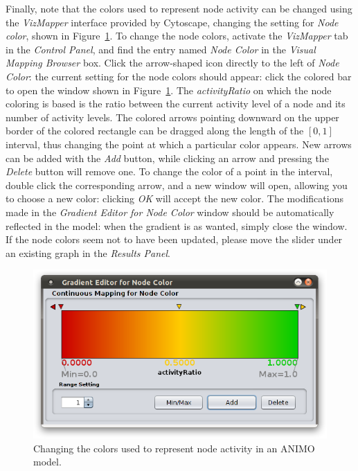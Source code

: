 Finally, note that the colors used to represent node activity can be changed using the \emph{VizMapper}
interface provided by Cytoscape, changing the setting for \emph{Node color}, shown in Figure~\ref{fig:change-gradient}.
To change the node colors, activate the \emph{VizMapper\texttrademark} tab in the \emph{Control Panel}, and
find the entry named \emph{Node Color} in the \emph{Visual Mapping Browser} box. Click the arrow-shaped
icon directly to the left of \emph{Node Color}: the current setting for the node colors should appear:
click the colored bar to open the window shown in Figure~\ref{fig:change-gradient}.
The \emph{activityRatio} on which the node coloring is based is the ratio between the current activity level
of a node and its number of activity levels.
The colored arrows pointing downward on the upper border of the colored rectangle can be dragged along the length of the $[0, 1]$
interval, thus changing the point at which a particular color appears. New arrows can be added with the \emph{Add} button, while
clicking an arrow and pressing the \emph{Delete} button will remove one. To change the color of a point in the interval,
double click the corresponding arrow, and a new window will open, allowing you to choose a new color: clicking \emph{OK} will
accept the new color. The modifications made in the \emph{Gradient Editor for Node Color} window should be automatically reflected in
the model: when the gradient is as wanted, simply close the window. If the node colors seem not to have been updated, please move the
slider under an existing graph in the \emph{Results Panel}.

\begin{figure}[!tpb]
\begin{minipage}{\textwidth}
\centering
  \includegraphics[width=.6\textwidth]{images/editing-gradient2}
  \caption{Changing the colors used to represent node activity in an ANIMO model.}\label{fig:change-gradient}
\end{minipage}
\end{figure}


